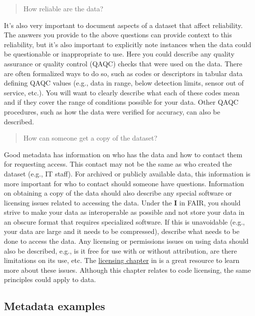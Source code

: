 \documentclass[
]{book}
\begin{document}
\begin{quote}
How reliable are the data?
\end{quote}

It's also very important to document aspects of a dataset that affect reliability. The answers you provide to the above questions can provide context to this reliability, but it's also important to explicitly note instances when the data could be questionable or inappropriate to use. Here you could describe any quality assurance or quality control (QAQC) checks that were used on the data. There are often formalized ways to do so, such as codes or descriptors in tabular data defining QAQC values (e.g., data in range, below detection limits, sensor out of service, etc.). You will want to clearly describe what each of these codes mean and if they cover the range of conditions possible for your data. Other QAQC procedures, such as how the data were verified for accuracy, can also be described.

\begin{quote}
How can someone get a copy of the dataset?
\end{quote}

Good metadata has information on who has the data and how to contact them for requesting access. This contact may not be the same as who created the dataset (e.g., IT staff). For archived or publicly available data, this information is more important for who to contact should someone have questions. Information on obtaining a copy of the data should also describe any special software or licensing issues related to accessing the data. Under the \textbf{I} in FAIR, you should strive to make your data as interoperable as possible and not store your data in an obscure format that requires specialized software. If this is unavoidable (e.g., your data are large and it needs to be compressed), describe what needs to be done to access the data. Any licensing or permissions issues on using data should also be described, e.g., is it free for use with or without attribution, are there limitations on its use, etc. The \href{https://r-pkgs.org/license.html}{licensing chapter} in \citet{Wickham15} is a great resource to learn more about these issues. Although this chapter relates to code licensing, the same principles could apply to data.

\hypertarget{metadata}{%
\subsection{Metadata examples}\label{metadata}}
\end{document}
